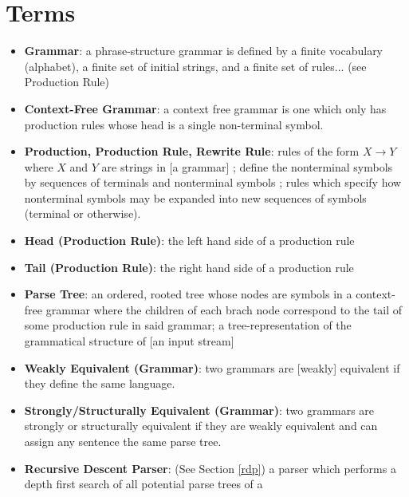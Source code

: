 \documentclass[11pt]{article}
\begin{document}
\clearpage

\section*{Terms}

\begin{itemize}
\item \textbf{Grammar}: a phrase-structure grammar is defined by a finite vocabulary (alphabet), a finite set of
initial strings, and a finite set of rules... \cite{chomsky} (see Production Rule)
\item \textbf{Context-Free Grammar}: a context free grammar is one which only has production rules whose head is a single non-terminal symbol.
\cite{compiler, anatomy, formal_langs}
\item \textbf{Production, Production Rule, Rewrite Rule}: rules of the form $X \rightarrow Y$ where
$X$ and $Y$ are strings in [a grammar]  \cite{chomsky};
define the nonterminal symbols by sequences of terminals and nonterminal symbols \cite{compiler};
rules which specify how nonterminal symbols may be expanded into new sequences of symbols (terminal or otherwise).
\item \textbf{Head (Production Rule)}: the left hand side of a production rule
\item \textbf{Tail (Production Rule)}: the right hand side of a production rule
\item \textbf{Parse Tree}: an ordered, rooted tree whose nodes are symbols in a context-free grammar where the 
children of each brach node correspond to the tail of some production rule in said grammar;
a tree-representation of the grammatical structure of [an input stream] \cite{anatomy}
\item \textbf{Weakly Equivalent (Grammar)}: two grammars are [weakly] equivalent if they define the same language.\cite{reghizzi}
\item \textbf{Strongly/Structurally Equivalent (Grammar)}: two grammars are strongly or structurally equivalent
if they are weakly equivalent and can assign any sentence the same parse tree. \cite{reghizzi}
\item \textbf{Recursive Descent Parser}: (See Section \ref{rdp}) a parser which performs a depth first search of all potential parse trees of a 
\cite{compiler, lewis}
\end{itemize}


{}

\end{document}

